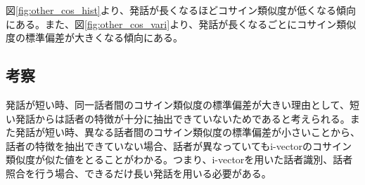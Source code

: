図\ref{fig:other_cos_hist}より、発話が長くなるほどコサイン類似度が低くなる傾向にある。また、図\ref{fig:other_cos_vari}より、発話が長くなるごとにコサイン類似度の標準偏差が大きくなる傾向にある。\par

\subsection{考察}
発話が短い時、同一話者間のコサイン類似度の標準偏差が大きい理由として、短い発話からは話者の特徴が十分に抽出できていないためであると考えられる。また発話が短い時、異なる話者間のコサイン類似度の標準偏差が小さいことから、話者の特徴を抽出できていない場合、話者が異なっていてもi-vectorのコサイン類似度が似た値をとることがわかる。つまり、i-vectorを用いた話者識別、話者照合を行う場合、できるだけ長い発話を用いる必要がある。
